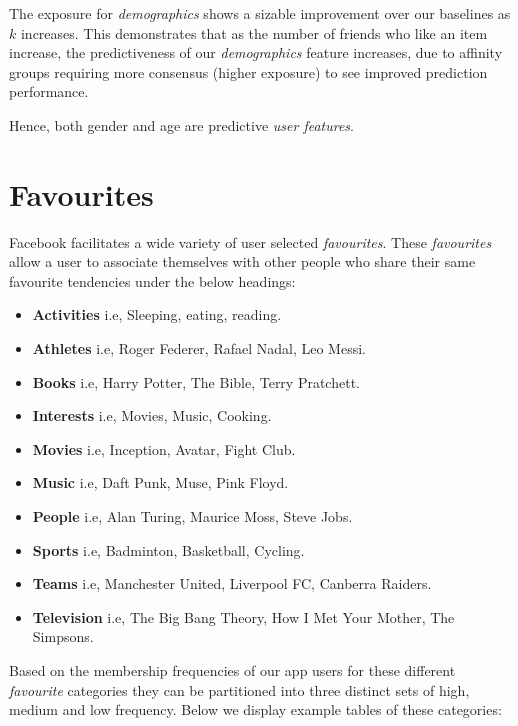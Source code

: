 The exposure for \emph{demographics} shows a sizable improvement over our baselines as $k$ increases. This demonstrates that as the
number of friends who like an item increase, the predictiveness of our \emph{demographics} feature increases, due to affinity groups requiring 
more consensus (higher exposure) to see improved prediction performance.

Hence, both gender and age are predictive \emph{user features}.

\section{Favourites}
\label{sec:traits}

Facebook facilitates a wide variety of user selected \emph{favourites}. 
These \emph{favourites} allow a user to associate themselves with other people who share their same favourite tendencies under the below headings:

\begin{itemize}
\item \textbf{Activities} i.e, Sleeping, eating, reading.
\item \textbf{Athletes} i.e, Roger Federer, Rafael Nadal, Leo Messi.
\item \textbf{Books} i.e, Harry Potter, The Bible, Terry Pratchett.
\item \textbf{Interests} i.e, Movies, Music, Cooking.
\item \textbf{Movies} i.e, Inception, Avatar, Fight Club.
\item \textbf{Music} i.e, Daft Punk, Muse, Pink Floyd.
\item \textbf{People} i.e, Alan Turing, Maurice Moss, Steve Jobs.
\item \textbf{Sports} i.e, Badminton, Basketball, Cycling.
\item \textbf{Teams} i.e, Manchester United, Liverpool FC, Canberra Raiders.
\item \textbf{Television} i.e, The Big Bang Theory, How I Met Your Mother, The Simpsons.
\end{itemize}

Based on the membership frequencies of our app users for these different \emph{favourite} categories they can be partitioned into three 
distinct sets of high, medium and low frequency.
Below we display example tables of these categories: 

